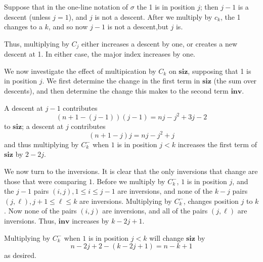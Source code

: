 \documentclass{amsart}[12pt]
\theoremstyle{definition}
\newcommand{\inv}{\mathbf{inv}}
\newcommand{\siz}{\mathbf{siz}}
\begin{document}
Suppose that in the one-line notation of $\sigma$ the 1 is in position $j$; then $j-1$ is a descent (unless $j=1$), and $j$ is not a descent.  After we multiply by $c_k$, the 1 changes to a $k$, and so now $j-1$ is not a descent,but $j$ is.

Thus, multiplying by $C_j$ either increases a descent by one, or creates a new descent at 1.  In either case, the major index increases by one.

We now investigate the effect of multipication by $C_k$ on $\siz$, supposing that 1 is in position $j$.  We first determine the change in the first term in $\siz$ (the sum over descents), and then determine the change this makes to the second term $\inv$.

A descent at $j-1$ contributes $$(n+1-(j-1))(j-1)=nj-j^2+3j-2$$ to $\siz$; a descent at $j$ contributes $$(n+1-j)j=nj-j^2+j$$
and thus multiplying by $C_k^-$ when $1$ is in position $j<k$ increases the first term of $\siz$ by $2-2j$.

We now turn to the inversions.  It is clear that the only inversions that change are those that were comparing $1$.  Before we multiply by $C_k^-$, $1$ is in position $j$, and the $j-1$ pairs $(i,j), 1\leq i \leq j-1$ are inversions, and none of the $k-j$ pairs $(j,\ell), j+1\leq \ell \leq k$ are inversions.  Multiplying by $C_k^-$, changes position $j$ to $k$.  Now none of the pairs $(i,j)$ are inversions, and all of the pairs $(j,\ell)$ are inversions.  Thus, $\inv$ increases by $k-2j+1$.  

Multiplying by $C_k^-$ when $1$ is in position $j<k$ will change $\siz$ by $$n-2j+2-(k-2j+1)=n-k+1$$ as desired.




  









\end{document}
